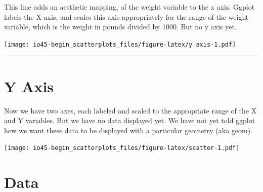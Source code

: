 \documentclass[
]{book}
\newenvironment{Shaded}{\begin{snugshade}}{\end{snugshade}}
\newcommand{\DataTypeTok}[1]{\textcolor[rgb]{0.13,0.29,0.53}{#1}}
\newcommand{\KeywordTok}[1]{\textcolor[rgb]{0.13,0.29,0.53}{\textbf{#1}}}
\newcommand{\NormalTok}[1]{#1}
\newcommand{\OperatorTok}[1]{\textcolor[rgb]{0.81,0.36,0.00}{\textbf{#1}}}
\newcommand{\StringTok}[1]{\textcolor[rgb]{0.31,0.60,0.02}{#1}}
\begin{document}
This line adds an aesthetic mapping, of the weight variable to the x axis. Ggplot labels the X axis, and scales this axis appropriately for the range of the weight variable, which is the weight in pounds divided by 1000. But no y axis yet.

\begin{Shaded}
\end{Shaded}

\texttt{[image: io45-begin\_scatterplots\_files/figure-latex/y axis-1.pdf]}

\begin{center}\rule{0.5\linewidth}{0.5pt}\end{center}

\hypertarget{y-axis}{%
\chapter{Y Axis}\label{y-axis}}

Now we have two axes, each labeled and scaled to the appropriate range of the X and Y variables. But we have no data displayed yet. We have not yet told ggplot how we want these data to be displayed with a particular geometry (aka geom).

\begin{Shaded}
\end{Shaded}

\texttt{[image: io45-begin\_scatterplots\_files/figure-latex/scatter-1.pdf]}

\hypertarget{data}{%
\chapter{Data}\label{data}}
\end{document}
